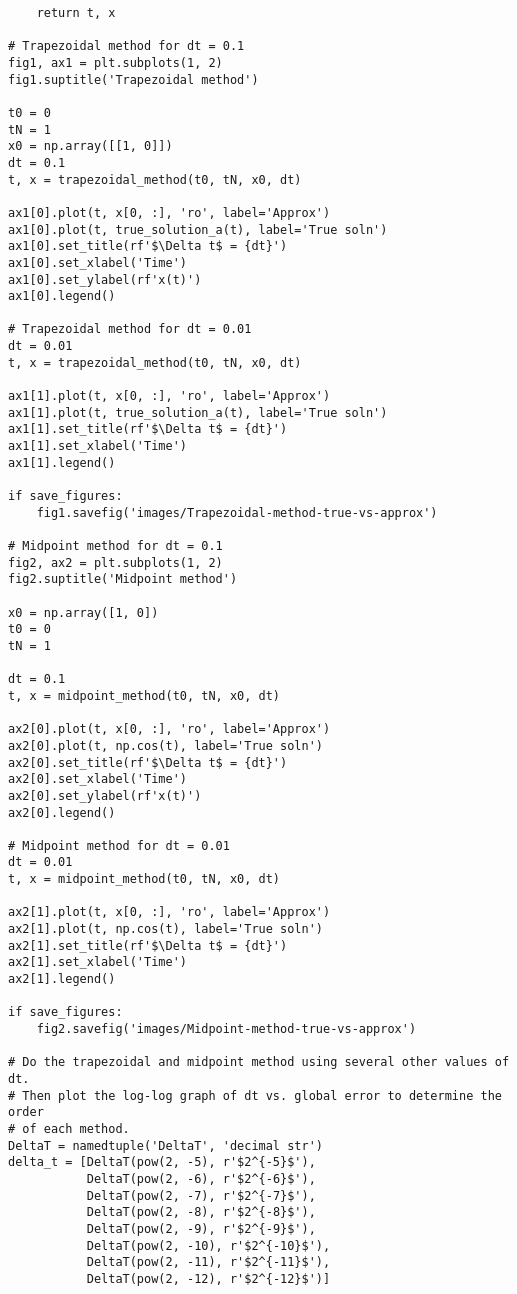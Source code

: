\documentclass{article}
\begin{document}
\begin{verbatim}
    return t, x

# Trapezoidal method for dt = 0.1
fig1, ax1 = plt.subplots(1, 2)
fig1.suptitle('Trapezoidal method')

t0 = 0
tN = 1
x0 = np.array([[1, 0]])
dt = 0.1
t, x = trapezoidal_method(t0, tN, x0, dt)

ax1[0].plot(t, x[0, :], 'ro', label='Approx')
ax1[0].plot(t, true_solution_a(t), label='True soln')
ax1[0].set_title(rf'$\Delta t$ = {dt}')
ax1[0].set_xlabel('Time')
ax1[0].set_ylabel(rf'x(t)')
ax1[0].legend()

# Trapezoidal method for dt = 0.01
dt = 0.01
t, x = trapezoidal_method(t0, tN, x0, dt)

ax1[1].plot(t, x[0, :], 'ro', label='Approx')
ax1[1].plot(t, true_solution_a(t), label='True soln')
ax1[1].set_title(rf'$\Delta t$ = {dt}')
ax1[1].set_xlabel('Time')
ax1[1].legend()

if save_figures:
    fig1.savefig('images/Trapezoidal-method-true-vs-approx')

# Midpoint method for dt = 0.1
fig2, ax2 = plt.subplots(1, 2)
fig2.suptitle('Midpoint method')

x0 = np.array([1, 0])
t0 = 0
tN = 1

dt = 0.1
t, x = midpoint_method(t0, tN, x0, dt)

ax2[0].plot(t, x[0, :], 'ro', label='Approx')
ax2[0].plot(t, np.cos(t), label='True soln')
ax2[0].set_title(rf'$\Delta t$ = {dt}')
ax2[0].set_xlabel('Time')
ax2[0].set_ylabel(rf'x(t)')
ax2[0].legend()

# Midpoint method for dt = 0.01
dt = 0.01
t, x = midpoint_method(t0, tN, x0, dt)

ax2[1].plot(t, x[0, :], 'ro', label='Approx')
ax2[1].plot(t, np.cos(t), label='True soln')
ax2[1].set_title(rf'$\Delta t$ = {dt}')
ax2[1].set_xlabel('Time')
ax2[1].legend()

if save_figures:
    fig2.savefig('images/Midpoint-method-true-vs-approx')

# Do the trapezoidal and midpoint method using several other values of dt.
# Then plot the log-log graph of dt vs. global error to determine the order
# of each method.
DeltaT = namedtuple('DeltaT', 'decimal str')
delta_t = [DeltaT(pow(2, -5), r'$2^{-5}$'),
           DeltaT(pow(2, -6), r'$2^{-6}$'),
           DeltaT(pow(2, -7), r'$2^{-7}$'),
           DeltaT(pow(2, -8), r'$2^{-8}$'),
           DeltaT(pow(2, -9), r'$2^{-9}$'),
           DeltaT(pow(2, -10), r'$2^{-10}$'),
           DeltaT(pow(2, -11), r'$2^{-11}$'),
           DeltaT(pow(2, -12), r'$2^{-12}$')]


\end{verbatim}
\end{document}
